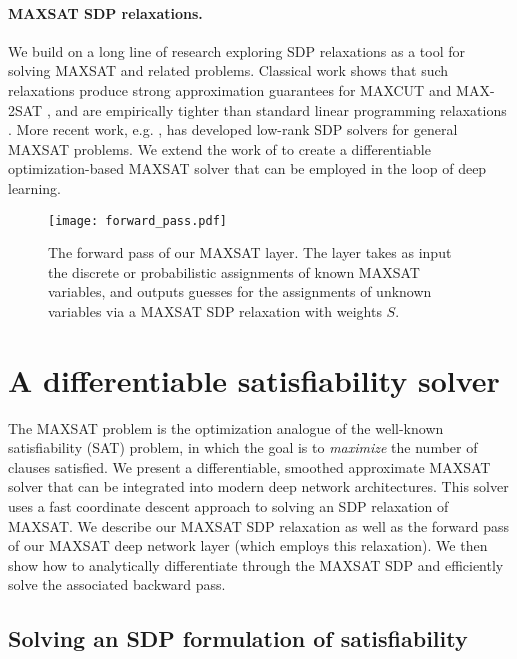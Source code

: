 \documentclass{article}
\begin{document}
	\vspace{-5pt}
	\paragraph{MAXSAT SDP relaxations.} We build on a long line of research exploring SDP relaxations as a tool for solving MAXSAT and related problems. 
	Classical work shows that such relaxations produce strong approximation guarantees for MAXCUT and MAX-2SAT \cite{goemans1995improved}, and are empirically tighter than standard linear programming relaxations \cite{gomes2006power}. 
	More recent work, e.g. \citet{wang2017mixing, wang2018low}, has developed low-rank SDP solvers for general MAXSAT problems.
	We extend the work of \citet{wang2017mixing} to create a differentiable optimization-based MAXSAT solver that can be employed in the loop of deep learning.
	
	\begin{figure*}[ht]
		\centering
		\texttt{[image: forward\_pass.pdf]}
		\caption{The forward pass of our MAXSAT layer. The layer takes as input the discrete or probabilistic assignments of known MAXSAT variables, and outputs guesses for the assignments of unknown variables via a MAXSAT SDP relaxation with weights $S$.}
		\label{fig:forward-pass}
	\end{figure*}
	
	\section{A differentiable satisfiability solver}
The MAXSAT problem is the optimization analogue of the well-known satisfiability (SAT) problem, in which the goal is to \emph{maximize} the number of clauses satisfied.
	We present a differentiable, smoothed approximate MAXSAT solver that can be integrated into modern deep network architectures. 
	This solver uses a fast coordinate descent approach to solving an SDP relaxation of MAXSAT.
	We describe our MAXSAT SDP relaxation as well as the forward pass of our MAXSAT deep network layer (which employs this relaxation).
	We then show how to analytically differentiate through the MAXSAT SDP and efficiently solve the associated backward pass.
	
	\subsection{Solving an SDP formulation of satisfiability}
	\label{sec:sdp}
	
\end{document}

